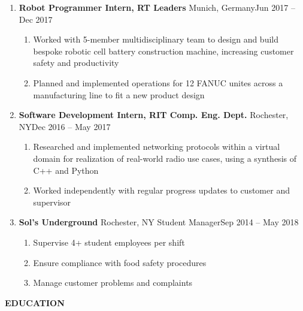 \documentclass[11pt]{article}
\newcommand{\customBulletLabel}{\raisebox{0.4ex}{\tiny$\bullet$}}   %
\begin{document}
\begin{enumerate}[label={}, itemsep=5pt]
    \item \textbf{Robot Programmer Intern, RT Leaders} \textbar{} Munich, Germany\hfill Jun 2017 -- Dec 2017
    \begin{enumerate}[label={\customBulletLabel}]
        \item Worked with 5-member multidisciplinary team to design and build bespoke robotic cell battery construction machine, increasing customer safety and productivity
        \item Planned and implemented operations for 12 FANUC unites across a manufacturing line to fit a new product design
    \end{enumerate}
    \item \textbf{Software Development Intern, RIT Comp. Eng. Dept.} \textbar{} Rochester, NY\hfill Dec 2016 -- May 2017
    \begin{enumerate}[label={--}]
        \item Researched and implemented networking protocols within a virtual domain for realization of real-world radio use cases, using a synthesis of C++ and Python
        \item Worked independently with regular progress updates to customer and supervisor 
    \end{enumerate}
    \item \textbf{Sol's Underground} \textbar{} Rochester, NY \textbar{} Student Manager\hfill Sep 2014 -- May 2018
    \begin{enumerate}[label={--}]
        \item Supervise 4+ student employees per shift
        \item Ensure compliance with food safety procedures
        \item Manage customer problems and complaints
    \end{enumerate}
\end{enumerate}
{\Large \textbf{EDUCATION}}
\end{document}
